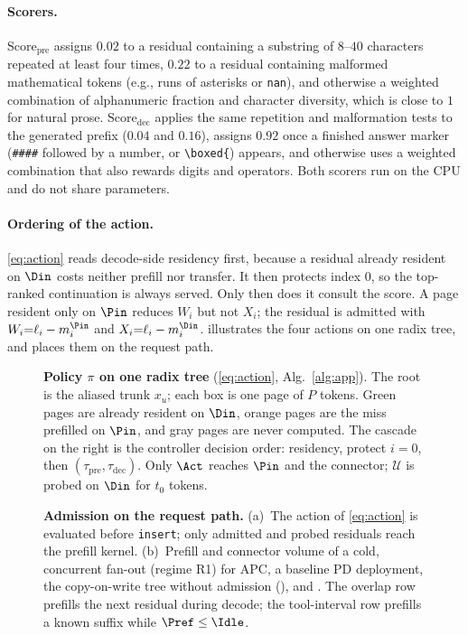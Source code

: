 \paragraph{Scorers.}
$\mathrm{Score}_{\mathrm{pre}}$ assigns $0.02$ to a residual containing a substring of $8$--$40$ characters repeated at least four times, $0.22$ to a residual containing malformed mathematical tokens (e.g., runs of asterisks or \texttt{nan}), and otherwise a weighted combination of alphanumeric fraction and character diversity, which is close to $1$ for natural prose.
$\mathrm{Score}_{\mathrm{dec}}$ applies the same repetition and malformation tests to the generated prefix ($0.04$ and $0.16$), assigns $0.92$ once a finished answer marker (\texttt{\#\#\#\#} followed by a number, or \texttt{\textbackslash boxed\{}) appears, and otherwise uses a weighted combination that also rewards digits and operators.
Both scorers run on the CPU and do not share parameters.

\paragraph{Ordering of the action.}
\eqref{eq:action} reads decode-side residency first, because a residual already resident on $\Din$ costs neither prefill nor transfer.
It then protects index $0$, so the top-ranked continuation is always served.
Only then does it consult the score.
A page resident only on $\Pin$ reduces $W_i$ but not $X_i$; the residual is admitted with $W_i{=}\ell_i-m_i^{\Pin}$ and $X_i{=}\ell_i-m_i^{\Din}$.
 illustrates the four actions on one radix tree, and  places them on the request path.

\begin{figure}[t]
\centering
\resizebox{\textwidth}{!}{}
\caption{\textbf{Policy $\pi$ on one radix tree} (\eqref{eq:action}, Alg.~\ref{alg:app}).
The root is the aliased trunk $x_u$; each box is one page of $P$ tokens.
Green pages are already resident on $\Din$, orange pages are the miss prefilled on $\Pin$, and gray pages are never computed.
The cascade on the right is the controller decision order: residency, protect $i{=}0$, then $(\tau_{\mathrm{pre}},\tau_{\mathrm{dec}})$.
Only $\Act$ reaches $\Pin$ and the connector; $\mathcal{U}$ is probed on $\Din$ for $t_0$ tokens.}
\label{fig:radix}
\end{figure}

\begin{figure}[t]
\centering
\resizebox{\textwidth}{!}{}
\caption{\textbf{Admission on the request path.}
(a)~The action of \eqref{eq:action} is evaluated before \texttt{insert}; only admitted and probed residuals reach the prefill kernel.
(b)~Prefill and connector volume of a cold, concurrent fan-out (regime R1) for APC, a baseline PD deployment, the copy-on-write tree without admission (\cowonly), and \sys.
The overlap row prefills the next residual during decode; the tool-interval row prefills a known suffix while $\Pref\le\Idle$.}
\label{fig:app}
\end{figure}

